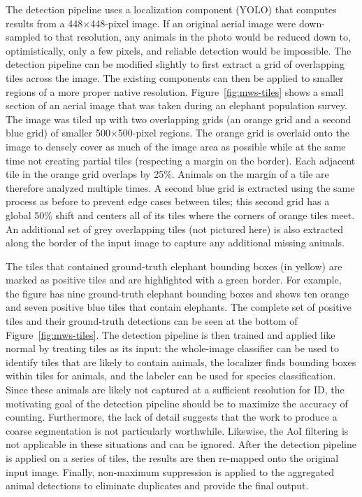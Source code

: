 The detection pipeline uses a localization component (YOLO) that computes results from a 448$\times$448-pixel image.  If an original aerial image were down-sampled to that resolution, any animals in the photo would be reduced down to, optimistically, only a few pixels, and reliable detection would be impossible.  The detection pipeline can be modified slightly to first extract a grid of overlapping tiles across the image. The existing components can then be applied to smaller regions of a more proper native resolution.  Figure~\ref{fig:mws-tiles} shows a small section of an aerial image that was taken during an elephant population survey.  The image was tiled up with two overlapping grids (an orange grid and a second blue grid) of smaller 500$\times$500-pixel regions.  The orange grid is overlaid onto the image to densely cover as much of the image area as possible while at the same time not creating partial tiles (respecting a margin on the border).  Each adjacent tile in the orange grid overlaps by 25\%.  Animals on the margin of a tile are therefore analyzed multiple times.  A second blue grid is extracted using the same process as before to prevent edge cases between tiles; this second grid has a global 50\% shift and centers all of its tiles where the corners of orange tiles meet.  An additional set of grey overlapping tiles (not pictured here) is also extracted along the border of the input image to capture any additional missing animals.

The tiles that contained ground-truth elephant bounding boxes (in yellow) are marked as positive tiles and are highlighted with a green border.  For example, the figure has nine ground-truth elephant bounding boxes and shows ten orange and seven positive blue tiles that contain elephants.  The complete set of positive tiles and their ground-truth detections can be seen at the bottom of Figure~\ref{fig:mws-tiles}.  The detection pipeline is then trained and applied like normal by treating tiles as its input: the whole-image classifier can be used to identify tiles that are likely to contain animals, the localizer finds bounding boxes within tiles for animals, and the labeler can be used for species classification.  Since these animals are likely not captured at a sufficient resolution for ID, the motivating goal of the detection pipeline should be to maximize the accuracy of counting.  Furthermore, the lack of detail suggests that the work to produce a coarse segmentation is not particularly worthwhile.  Likewise, the AoI filtering is not applicable in these situations and can be ignored.  After the detection pipeline is applied on a series of tiles, the results are then re-mapped onto the original input image. Finally, non-maximum suppression is applied to the aggregated animal detections to eliminate duplicates and provide the final output.

